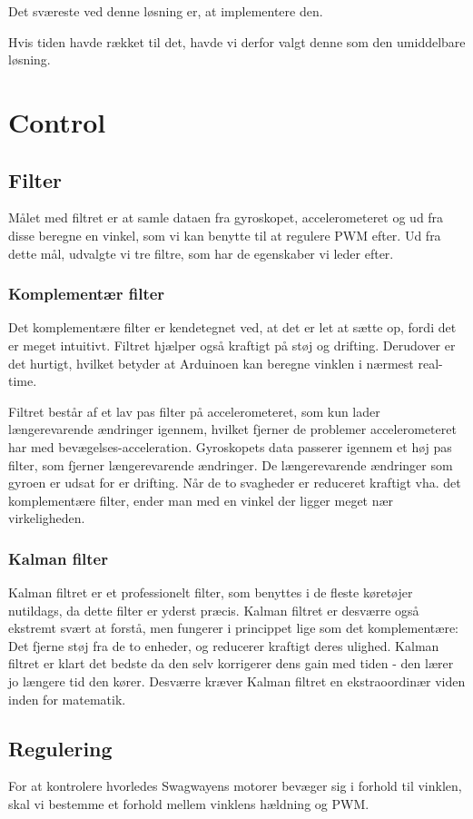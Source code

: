 \documentclass[a4paper,oneside,article,danish,table]{memoir}
\begin{document}
Det sværeste ved denne løsning er, at implementere den. 

Hvis tiden havde rækket til det, havde vi derfor valgt denne som den umiddelbare løsning.
\chapter{Control}
\section{Filter}\label{sec:filter}
Målet med filtret er at samle dataen fra gyroskopet, accelerometeret og ud fra disse beregne en vinkel, som vi kan benytte til at regulere PWM efter. Ud fra dette mål, udvalgte vi tre filtre, som har de egenskaber vi leder efter.
\subsection{Komplementær filter}
Det komplementære filter er kendetegnet ved, at det er let at sætte op, fordi det er meget intuitivt. Filtret hjælper også kraftigt på støj og drifting. Derudover er det hurtigt, hvilket betyder at Arduinoen kan beregne vinklen i nærmest real-time. 

Filtret består af et lav pas filter på accelerometeret, som kun lader længerevarende ændringer igennem, hvilket fjerner de problemer accelerometeret har med bevægelses-acceleration. Gyroskopets data passerer igennem et høj pas filter, som fjerner længerevarende ændringer. De længerevarende ændringer som gyroen er udsat for er drifting. Når de to svagheder er reduceret kraftigt vha. det komplementære filter, ender man med en vinkel der ligger meget nær virkeligheden.
\subsection{Kalman filter}
Kalman filtret er et professionelt filter, som benyttes i de fleste køretøjer nutildags, da dette filter er yderst præcis. Kalman filtret er desværre også ekstremt svært at forstå, men fungerer i princippet lige som det komplementære: Det fjerne støj fra de to enheder, og reducerer kraftigt deres ulighed. Kalman filtret er klart det bedste da den selv korrigerer dens gain med tiden - den lærer jo længere tid den kører. Desværre kræver Kalman filtret en ekstraoordinær viden inden for matematik.

\section{Regulering}
For at kontrolere hvorledes Swagwayens motorer bevæger sig i forhold til vinklen, skal vi bestemme et forhold mellem vinklens hældning og PWM. 
\end{document}
